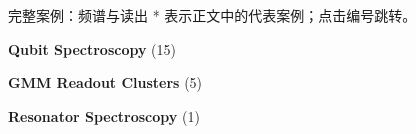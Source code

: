 \begin{frame}[label=case-index-other]{完整案例：频谱与读出}
\setlength{\parskip}{.6mm}\small
* 表示正文中的代表案例；点击编号跳转。\par\vspace{2mm}
\textbf{Qubit Spectroscopy} (15)\par \hyperlink{case-spectroscopy-002}{} \hyperlink{case-spectroscopy-004}{} \hyperlink{case-spectroscopy-005}{} \hyperlink{case-spectroscopy-006}{} \hyperlink{case-spectroscopy-007}{} \hyperlink{case-spectroscopy-008}{} \hyperlink{case-spectroscopy-009}{} \hyperlink{case-spectroscopy-011}{}\par\vspace{1mm}\hyperlink{case-spectroscopy-012}{} \hyperlink{case-spectroscopy-013}{} \hyperlink{case-spectroscopy-014}{} \hyperlink{case-spectroscopy-015}{} \hyperlink{case-spectroscopy-016}{} \hyperlink{case-spectroscopy-017}{} \hyperlink{case-spectroscopy-018}{}\par\vspace{2mm}
\textbf{GMM Readout Clusters} (5)\par \hyperlink{case-readout-002}{} \hyperlink{case-readout-003}{} \hyperlink{case-readout-004}{} \hyperlink{case-readout-005}{} \hyperlink{case-readout-008}{}\par\vspace{2mm}
\textbf{Resonator Spectroscopy} (1)\par \hyperlink{case-resonator-006}{}\par\vspace{2mm}
\vfill\hyperlink{case-index}{}
\end{frame}
